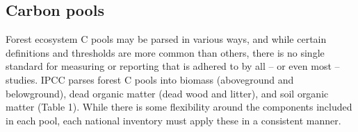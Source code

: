 \documentclass[, manuscript]{copernicus}
\begin{document}
\subsection{Carbon pools}

Forest ecosystem C pools may be parsed in various ways, and while
certain definitions and thresholds are more common than others, there is
no single standard for measuring or reporting that is adhered to by all
-- or even most -- studies. IPCC parses forest C pools into biomass
(aboveground and belowground), dead organic matter (dead wood and
litter), and soil organic matter (Table 1). While there is some
flexibility around the components included in each pool, each national
inventory must apply these in a consistent manner.

\begin{table}


\end{table}
\end{document}

